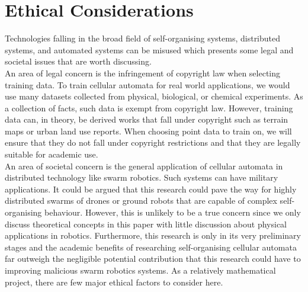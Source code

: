 \section{Ethical Considerations}
Technologies falling in the broad field of self-organising systems, distributed systems, and automated systems can be misused which presents some legal and societal issues that are worth discussing.\\

An area of legal concern is the infringement of copyright law when selecting training data. To train cellular automata for real world applications, we would use many datasets collected from physical, biological, or chemical experiments. As a collection of facts, such data is exempt from copyright law. However, training data can, in theory, be derived works that fall under copyright such as terrain maps or urban land use reports. When choosing point data to train on, we will ensure that they do not fall under copyright restrictions and that they are legally suitable for academic use.\\

An area of societal concern is the general application of cellular automata in distributed technology like swarm robotics. Such systems can have military applications. It could be argued that this research could pave the way for highly distributed swarms of drones or ground robots that are capable of complex self-organising behaviour. However, this is unlikely to be a true concern since we only discuss theoretical concepts in this paper with little discussion about physical applications in robotics. Furthermore, this research is only in its very preliminary stages and the academic benefits of researching self-organising cellular automata far outweigh the negligible potential contribution that this research could have to improving malicious swarm robotics systems. As a relatively mathematical project, there are few major ethical factors to consider here.\\

